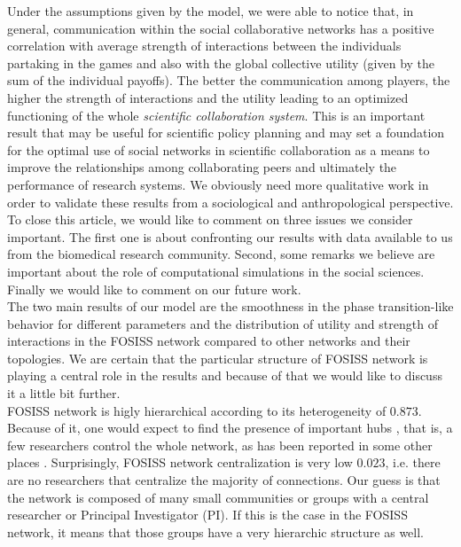 \documentclass[11pt]{article}
\begin{document}
{\color{red}Under the assumptions given by the model, we were able to
  notice that, in general, communication within the social
  collaborative networks has a positive correlation with average
  strength of interactions between the individuals partaking in the
  games and also with the global collective utility (given by the sum
  of the individual payoffs). The better the communication among
  players, the higher the strength of interactions and the utility
  leading to an optimized functioning of the whole \emph{scientific
    collaboration system}. This is an important result that may be
  useful for scientific policy planning and may set a foundation for
  the optimal use of social networks in scientific collaboration as a
  means to improve the relationships among collaborating peers and
  ultimately the performance of research systems.  We obviously need
  more qualitative work in order to validate these results from a
  sociological and anthropological perspective.\\


{\color{red}To close this article, we would like to comment on three
  issues we consider important. The first one is about confronting our
  results with data available to us from the biomedical research
  community. Second, some remarks we believe are important about the
  role of computational simulations in the social sciences. Finally we
  would like to comment on our future work.}\\


{\color{red}The two main results of our model are the smoothness in
  the phase transition-like behavior for different parameters and the
  distribution of utility and strength of interactions in the FOSISS
  network compared to other networks and their topologies. We are
  certain that the particular structure of FOSISS network is playing a
  central role in the results and because of that we would like to
  discuss it a little bit further.}\\

{\color{red}FOSISS network is higly hierarchical according to its
  heterogeneity of $0.873$. Because of it, one would expect to find
  the presence of important hubs \cite{Wu-etal2008}, that is, a few
  researchers control the whole network, as has been reported in some
  other places \cite{yousefi-etal2008}. Surprisingly, FOSISS network
  centralization is very low $0.023$, i.e. there are no researchers
  that centralize the majority of connections. Our guess is that the
  network is composed of many small communities or groups with a
  central researcher or Principal Investigator (PI). If this is the
  case in the FOSISS network, it means that those groups have a very
  hierarchic structure as well.}\\

}
\end{document}
